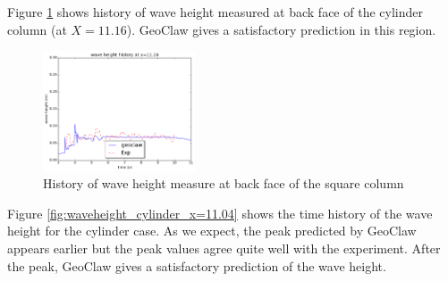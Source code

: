 \documentclass[11pt]{article}
\begin{document}
\par
Figure \ref{fig:waveheight_cylinder_back} shows history of wave height measured at back face of the cylinder column (at $X = 11.16$). 
GeoClaw gives a satisfactory prediction in this region.
\begin{figure}[h!]
    \centering
    \includegraphics[width=0.4\textwidth]{./plots/waveheight_cylinder_back}
    \caption{History of wave height measure at back face of the square column}
    \label{fig:waveheight_cylinder_back}
\end{figure}

\par
Figure \ref{fig:waveheight_cylinder_x=11.04} shows the time history of the wave height for the cylinder case. As we expect, the peak predicted by GeoClaw appears earlier but the peak values agree quite well with the experiment.
After the peak, GeoClaw gives a satisfactory prediction of the wave height.
\end{document}
